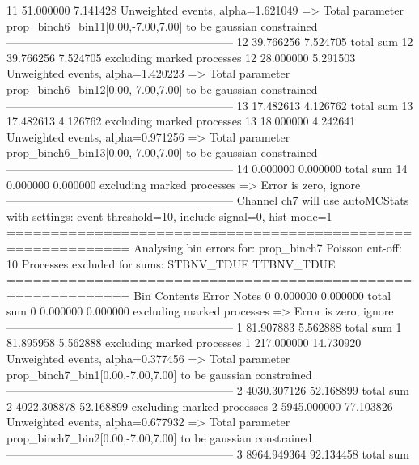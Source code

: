 11         51.000000       7.141428        Unweighted events, alpha=1.621049
  => Total parameter prop_binch6_bin11[0.00,-7.00,7.00] to be gaussian constrained
------------------------------------------------------------
12         39.766256       7.524705        total sum                     
12         39.766256       7.524705        excluding marked processes    
12         28.000000       5.291503        Unweighted events, alpha=1.420223
  => Total parameter prop_binch6_bin12[0.00,-7.00,7.00] to be gaussian constrained
------------------------------------------------------------
13         17.482613       4.126762        total sum                     
13         17.482613       4.126762        excluding marked processes    
13         18.000000       4.242641        Unweighted events, alpha=0.971256
  => Total parameter prop_binch6_bin13[0.00,-7.00,7.00] to be gaussian constrained
------------------------------------------------------------
14         0.000000        0.000000        total sum                     
14         0.000000        0.000000        excluding marked processes    
  => Error is zero, ignore      
------------------------------------------------------------
Channel ch7 will use autoMCStats with settings: event-threshold=10, include-signal=0, hist-mode=1
============================================================
Analysing bin errors for: prop_binch7
Poisson cut-off: 10
Processes excluded for sums: STBNV_TDUE TTBNV_TDUE
============================================================
Bin        Contents        Error           Notes                         
0          0.000000        0.000000        total sum                     
0          0.000000        0.000000        excluding marked processes    
  => Error is zero, ignore      
------------------------------------------------------------
1          81.907883       5.562888        total sum                     
1          81.895958       5.562888        excluding marked processes    
1          217.000000      14.730920       Unweighted events, alpha=0.377456
  => Total parameter prop_binch7_bin1[0.00,-7.00,7.00] to be gaussian constrained
------------------------------------------------------------
2          4030.307126     52.168899       total sum                     
2          4022.308878     52.168899       excluding marked processes    
2          5945.000000     77.103826       Unweighted events, alpha=0.677932
  => Total parameter prop_binch7_bin2[0.00,-7.00,7.00] to be gaussian constrained
------------------------------------------------------------
3          8964.949364     92.134458       total sum                     
